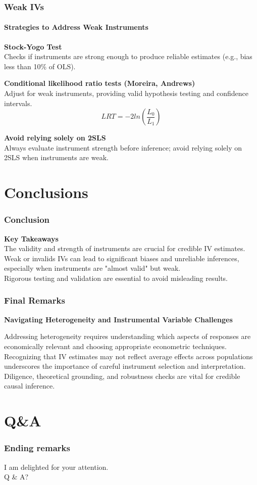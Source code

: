 \documentclass{beamer} %
\theoremstyle{definition}
\begin{document}
	\begin{frame}[fragile]
		\frametitle{Weak IVs}
		\framesubtitle{Strategies to Address Weak Instruments}
		\textbf{Stock-Yogo Test}\\
		Checks if instruments are strong enough to produce reliable estimates (e.g., bias less than 10\% of OLS).
		
		\vspace{1em}
		\textbf{Conditional likelihood ratio tests (Moreira, Andrews)}\\
		Adjust for weak instruments, providing valid hypothesis testing and confidence intervals.
		$$ LRT = -2 ln \left(\frac{L_0}{L_1}\right) $$
		
		\vspace{1em}
		\textbf{Avoid relying solely on 2SLS}\\
		Always evaluate instrument strength before inference; avoid relying solely on 2SLS when instruments are weak.
	\end{frame}
	\section{Conclusions}
	
	\begin{frame}[fragile] 
		\frametitle{Conclusion} 
		\textbf{Key Takeaways} \\
		
		The validity and strength of instruments are crucial for credible IV estimates. Weak or invalids IVs can lead to significant biases and unreliable inferences, especially when instruments are "almost valid" but weak.\\
		\vspace{1em}	
		Rigorous testing and validation are essential to avoid misleading results. 
	\end{frame}
	
	\begin{frame}[fragile]
		\frametitle{Final Remarks} 
		\textbf{Navigating Heterogeneity and Instrumental Variable Challenges} \
		
		Addressing heterogeneity requires understanding which aspects of responses are economically relevant and choosing appropriate econometric techniques.\\
		\vspace{1em}
		Recognizing that IV estimates may not reflect average effects across populations underscores the importance of careful instrument selection and interpretation. Diligence, theoretical grounding, and robustness checks are vital for credible causal inference. 
	\end{frame}
	
	\section{Q\&A}
	\begin{frame}[fragile]
		\frametitle{Ending remarks}
		\begin{center}
			I am delighted for your attention.\\
			\vspace{1em}
			Q \& A?
		\end{center}
	\end{frame}
	
\end{document}
